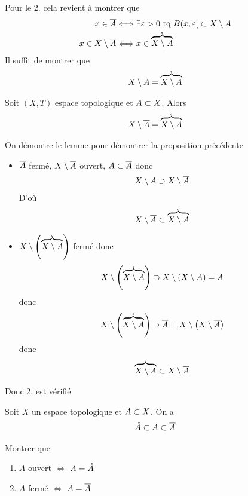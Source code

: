\documentclass[french,a4paper,10pt]{article}
\begin{document}
\begin{myproof}
		Pour le $2.$ cela revient à montrer que 
		\[\begin{aligned}
			x\in\overline{A} &\Longleftrightarrow \exists\varepsilon>0\text{ tq }B({x, \varepsilon}\mathopen{}[\mathclose{}\subset X\setminus A\\
			x\in X\setminus\overline{A}&\Longleftrightarrow x\in \mathring{\overbrace{X\setminus A}}
		\end{aligned}\]
		Il suffit de montrer que 
		\[\begin{aligned}
			X\setminus \overline{A} = \mathring{\overbrace{X\setminus A}}
		\end{aligned}\]
		\begin{lemme}
			Soit $(X, T)$ espace topologique et $A\subset X$. Alors
			\[\begin{aligned}
				X\setminus \overline{A} = \mathring{\overbrace{X\setminus A}}
			\end{aligned}\]
		\end{lemme}
		\begin{myproof}
			On démontre le lemme pour démontrer la proposition précédente
			\begin{itemize}[$\subset$]
				\item $\overline{A}$ fermé, $X\setminus\overline{A}$ ouvert, $A\subset \overline{A}$ donc 
				\[\begin{aligned}
					X\setminus A \supset X\setminus \overline{A}
				\end{aligned}\]
				D'où
				\[\begin{aligned}
					X\setminus \overline{A} \subset \mathring{\overbrace{X\setminus A}}
				\end{aligned}\]
			\end{itemize}
			\begin{itemize}[$\supset$]
				\item $X\setminus \left(\mathring{\overbrace{X\setminus A}}\right)$ fermé donc 
				\[\begin{aligned}
					X\setminus \left(\mathring{\overbrace{X\setminus A}}\right) \supset X\setminus \left(X\setminus A\right) = A
				\end{aligned}\]
				donc 
				\[\begin{aligned}
					X\setminus \left(\mathring{\overbrace{X\setminus A}}\right) \supset \overline{A} = X\setminus\left(X\setminus\overline{A}\right)
				\end{aligned}\]
				donc 
				\[\begin{aligned}
					\mathring{\overbrace{X\setminus A}} \subset X\setminus \overline{A}
				\end{aligned}\]
			\end{itemize}
		\end{myproof}
		Donc $2.$ est vérifié
	\end{myproof}
	\begin{remark}
		Soit $X$ un espace topologique et $A\subset X$. On a 
			\[\begin{aligned}
				\mathring{A}\subset A\subset \overline{A}
			\end{aligned}\]
		\begin{exercise}
			Montrer que 
			\begin{enumerate}
				\item $A$ ouvert $\Longleftrightarrow$ $A=\mathring{A}$
				\item $A$ fermé $\Longleftrightarrow$ $A=\overline{A}$
			\end{enumerate}
		\end{exercise}
	\end{remark}
\end{document}
